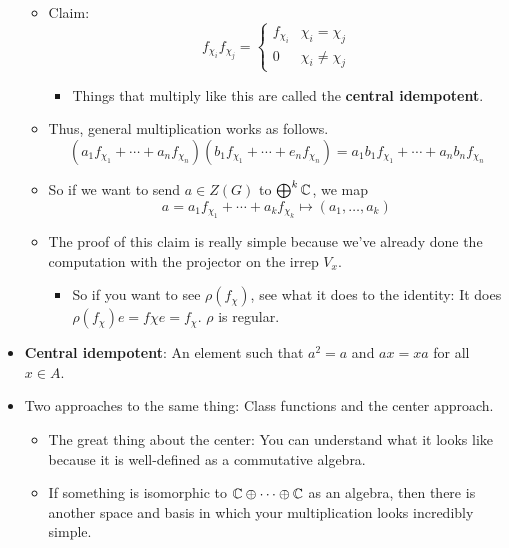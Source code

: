 \documentclass[../notes.tex]{subfiles}
\begin{document}
\begin{itemize}
\begin{itemize}
        \item Claim:
        \begin{equation*}
            f_{\chi_i}f_{\chi_j} =
            \begin{cases}
                f_{\chi_i} & \chi_i=\chi_j\\
                0 & \chi_i\neq\chi_j
            \end{cases}
        \end{equation*}
        \begin{itemize}
            \item Things that multiply like this are called the \textbf{central idempotent}.
        \end{itemize}
        \item Thus, general multiplication works as follows.
        \begin{equation*}
            (a_1f_{\chi_1}+\cdots+a_nf_{\chi_n})(b_1f_{\chi_1}+\cdots+e_nf_{\chi_n}) = a_1b_1f_{\chi_1}+\cdots+a_nb_nf_{\chi_n}
        \end{equation*}
        \item So if we want to send $a\in Z(G)$ to $\bigoplus^k\mathbb{C}$, we map
        \begin{equation*}
            a=a_1f_{\chi_1}+\cdots+a_kf_{\chi_k} \mapsto (a_1,\dots,a_k)
        \end{equation*}
        \item The proof of this claim is really simple because we've already done the computation with the projector on the irrep $V_x$.
        \begin{itemize}
            \item So if you want to see $\rho(f_\chi)$, see what it does to the identity: It does $\rho(f_\chi)e=f\chi e=f_\chi$. $\rho$ is regular.
        \end{itemize}
    \end{itemize}
    \item \textbf{Central idempotent}: An element such that $a^2=a$ and $ax=xa$ for all $x\in A$.
    \item Two approaches to the same thing: Class functions and the center approach.
    \begin{itemize}
        \item The great thing about the center: You can understand what it looks like because it is well-defined as a commutative algebra.
        \item If something is isomorphic to $\mathbb{C}\oplus\cdots\oplus\mathbb{C}$ as an algebra, then there is another space and basis in which your multiplication looks incredibly simple.

\end{itemize}
\end{itemize}
\end{document}
